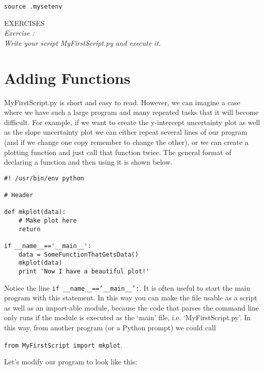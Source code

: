 \texttt{\termtab source .mysetenv}

{\color{blue} {\sf\small EXERCISES}} \\
{\it Exercise  :  \\
  Write your script MyFirstScript.py and execute it.
}

\section{Adding Functions}
\label{s:fun}
MyFirstScript.py is short and easy to read.  However, we can imagine a
case where we have such a large program and many repeated tasks that
it will become difficult.  For example, if we want to create the
y-intercept uncertainty plot as well as the slope uncertainty plot we
can either repeat several lines of our program (and if we change one
copy remember to change the other), or we can create a plotting
function and just call that function twice.  The general format of
declaring a function and then using it is shown below.

\begin{verbatim}
#! /usr/bin/env python

# Header

def mkplot(data): 
    # Make plot here
    return

if __name__=='__main__':
    data = SomeFunctionThatGetsData()
    mkplot(data)
    print 'Now I have a beautiful plot!'
\end{verbatim}

Notice the line \texttt{if \_\_name\_\_=='\_\_main\_\_':}.  It is often useful
to start the main program with this statement.  In this way you can
make the file usable as a script as well as an import-able module,
because the code that parses the command line only runs if the module
is executed as the `main' file, i.e. `MyFirstScript.py'.  In this way,
from another program (or a Python prompt) we could call

\texttt{from MyFirstScript import mkplot}.   

Let's modify our program to look like this:


